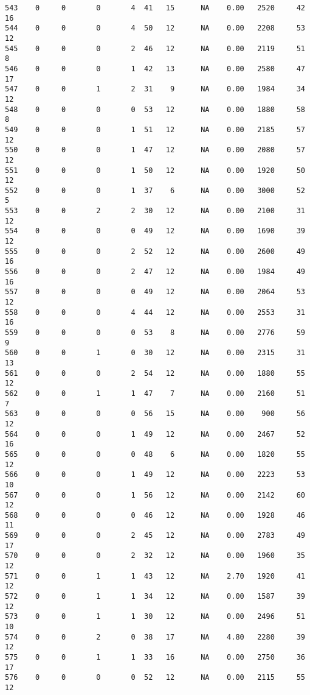 \documentclass[
  letterpaper,
  DIV=11,
  numbers=noendperiod]{scrreprt}
\begin{document}
\begin{verbatim}
543    0     0       0       4  41   15      NA    0.00   2520     42      16
544    0     0       0       4  50   12      NA    0.00   2208     53      12
545    0     0       0       2  46   12      NA    0.00   2119     51       8
546    0     0       0       1  42   13      NA    0.00   2580     47      17
547    0     0       1       2  31    9      NA    0.00   1984     34      12
548    0     0       0       0  53   12      NA    0.00   1880     58       8
549    0     0       0       1  51   12      NA    0.00   2185     57      12
550    0     0       0       1  47   12      NA    0.00   2080     57      12
551    0     0       0       1  50   12      NA    0.00   1920     50      12
552    0     0       0       1  37    6      NA    0.00   3000     52       5
553    0     0       2       2  30   12      NA    0.00   2100     31      12
554    0     0       0       0  49   12      NA    0.00   1690     39      12
555    0     0       0       2  52   12      NA    0.00   2600     49      16
556    0     0       0       2  47   12      NA    0.00   1984     49      16
557    0     0       0       0  49   12      NA    0.00   2064     53      12
558    0     0       0       4  44   12      NA    0.00   2553     31      16
559    0     0       0       0  53    8      NA    0.00   2776     59       9
560    0     0       1       0  30   12      NA    0.00   2315     31      13
561    0     0       0       2  54   12      NA    0.00   1880     55      12
562    0     0       1       1  47    7      NA    0.00   2160     51       7
563    0     0       0       0  56   15      NA    0.00    900     56      12
564    0     0       0       1  49   12      NA    0.00   2467     52      16
565    0     0       0       0  48    6      NA    0.00   1820     55      12
566    0     0       0       1  49   12      NA    0.00   2223     53      10
567    0     0       0       1  56   12      NA    0.00   2142     60      12
568    0     0       0       0  46   12      NA    0.00   1928     46      11
569    0     0       0       2  45   12      NA    0.00   2783     49      17
570    0     0       0       2  32   12      NA    0.00   1960     35      12
571    0     0       1       1  43   12      NA    2.70   1920     41      12
572    0     0       1       1  34   12      NA    0.00   1587     39      12
573    0     0       1       1  30   12      NA    0.00   2496     51      10
574    0     0       2       0  38   17      NA    4.80   2280     39      12
575    0     0       1       1  33   16      NA    0.00   2750     36      17
576    0     0       0       0  52   12      NA    0.00   2115     55      12

\end{verbatim}
\end{document}
